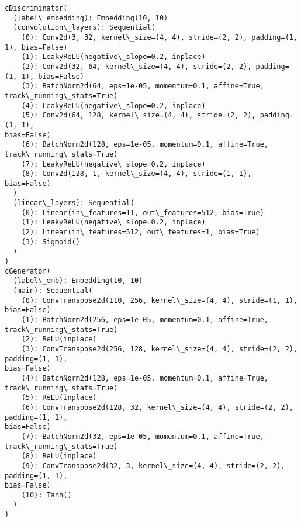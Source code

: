 \documentclass[11pt]{article}
\begin{document}
    \begin{Verbatim}[commandchars=\\\{\},fontsize=\footnotesize]
cDiscriminator(
  (label\_embedding): Embedding(10, 10)
  (convolution\_layers): Sequential(
    (0): Conv2d(3, 32, kernel\_size=(4, 4), stride=(2, 2), padding=(1, 1), bias=False)
    (1): LeakyReLU(negative\_slope=0.2, inplace)
    (2): Conv2d(32, 64, kernel\_size=(4, 4), stride=(2, 2), padding=(1, 1), bias=False)
    (3): BatchNorm2d(64, eps=1e-05, momentum=0.1, affine=True,
track\_running\_stats=True)
    (4): LeakyReLU(negative\_slope=0.2, inplace)
    (5): Conv2d(64, 128, kernel\_size=(4, 4), stride=(2, 2), padding=(1, 1),
bias=False)
    (6): BatchNorm2d(128, eps=1e-05, momentum=0.1, affine=True,
track\_running\_stats=True)
    (7): LeakyReLU(negative\_slope=0.2, inplace)
    (8): Conv2d(128, 1, kernel\_size=(4, 4), stride=(1, 1), bias=False)
  )
  (linear\_layers): Sequential(
    (0): Linear(in\_features=11, out\_features=512, bias=True)
    (1): LeakyReLU(negative\_slope=0.2, inplace)
    (2): Linear(in\_features=512, out\_features=1, bias=True)
    (3): Sigmoid()
  )
)
cGenerator(
  (label\_emb): Embedding(10, 10)
  (main): Sequential(
    (0): ConvTranspose2d(110, 256, kernel\_size=(4, 4), stride=(1, 1), bias=False)
    (1): BatchNorm2d(256, eps=1e-05, momentum=0.1, affine=True,
track\_running\_stats=True)
    (2): ReLU(inplace)
    (3): ConvTranspose2d(256, 128, kernel\_size=(4, 4), stride=(2, 2), padding=(1, 1),
bias=False)
    (4): BatchNorm2d(128, eps=1e-05, momentum=0.1, affine=True,
track\_running\_stats=True)
    (5): ReLU(inplace)
    (6): ConvTranspose2d(128, 32, kernel\_size=(4, 4), stride=(2, 2), padding=(1, 1),
bias=False)
    (7): BatchNorm2d(32, eps=1e-05, momentum=0.1, affine=True,
track\_running\_stats=True)
    (8): ReLU(inplace)
    (9): ConvTranspose2d(32, 3, kernel\_size=(4, 4), stride=(2, 2), padding=(1, 1),
bias=False)
    (10): Tanh()
  )
)

    \end{Verbatim}
\end{document}
